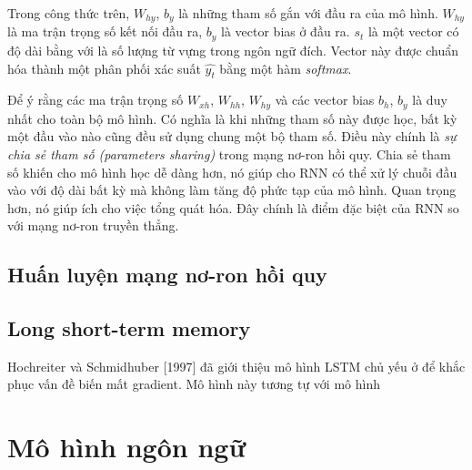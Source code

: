 Trong công thức trên, $W_{hy}$, $b_y$ là những tham số gắn với đầu ra của mô hình. $W_{hy}$ là ma trận trọng số kết nối đầu ra, $b_y$ là vector bias ở đầu ra. $s_t$ là một vector có độ dài bằng với là số lượng từ vựng trong ngôn ngữ đích. Vector này được chuẩn hóa thành một phân phối xác suất $\hat{y_t}$ bằng một hàm \textit{softmax}.

Để ý rằng các ma trận trọng số $W_{xh}$, $W_{hh}$, $W_{hy}$ và các vector bias $b_h$, $b_y$ là duy nhất cho toàn bộ mô hình. Có nghĩa là khi những tham số này được học, bất kỳ một đầu vào nào cũng đều sử dụng chung một bộ tham số. Điều này chính là \textit{sự chia sẻ tham số (parameters sharing)} trong mạng nơ-ron hồi quy. Chia sẻ tham số khiến cho mô hình học dễ dàng hơn, nó giúp cho RNN có thể xử lý chuỗi đầu vào với độ dài bất kỳ mà không làm tăng độ phức tạp của mô hình. Quan trọng hơn, nó giúp ích cho việc tổng quát hóa. Đây chính là điểm đặc biệt của RNN so với mạng nơ-ron truyền thẳng.



\subsection{Huấn luyện mạng nơ-ron hồi quy}



\subsection{Long short-term memory}

Hochreiter và Schmidhuber [1997] đã giới thiệu mô hình LSTM chủ yếu ở để khắc phục vấn đề biến mất gradient. Mô hình này tương tự với mô hình 

\section{Mô hình ngôn ngữ}


